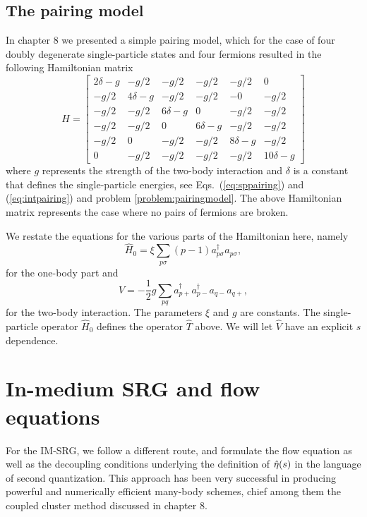 \subsection{The pairing model}
In chapter 8 we presented a simple pairing model, which for the case of four doubly degenerate single-particle states and 
four fermions resulted in the following Hamiltonian matrix
 \[
  H = \begin{bmatrix}
  2\delta -g & -g/2 & -g/2 & -g/2 & -g/2 & 0 \\ -g/2 & 4\delta -g &
  -g/2 & -g/2 & -0 & -g/2 \\ -g/2 & -g/2 & 6\delta -g & 0 & -g/2 &
  -g/2 \\ -g/2 & -g/2 & 0 & 6\delta-g & -g/2 & -g/2 \\ -g/2 & 0 & -g/2
  & -g/2 & 8\delta-g & -g/2 \\ 0 & -g/2 & -g/2 & -g/2 & -g/2 &
  10\delta -g
  \end{bmatrix}
  \]
where $g$ represents the strength of the two-body interaction and $\delta$ is a constant that defines the single-particle energies, see Eqs.~(\ref{eq:sppairing}) and 
(\ref{eq:intpairing}) and problem \ref{problem:pairingmodel}.  The above Hamiltonian matrix represents the case where no pairs of fermions are broken.

We restate the equations for the various parts of the Hamiltonian here, namely
 \[
  \hat{H}_0 = \xi \sum_{p \sigma} (p-1) a^{\dagger}_{p \sigma} a_{p\sigma},
  \]
for the one-body part
and 
  \[
  \hat{V} = -\frac{1}{2}g \sum_{pq} a^{\dagger}_{p+}a^{\dagger}_{p-}a_{q-}a_{q+},
  \]
for the two-body interaction. The parameters $\xi$ and $g$ are constants.
The single-particle operator $\hat{H}_0$ defines the operator $\hat{T}$ above. We will let $\hat{V}$ have an explicit $s$ dependence. 



\section{In-medium SRG and flow equations}
For the IM-SRG, we follow a different route, and formulate the flow equation as well as the decoupling conditions underlying the definition of $\hat{\eta}(s)$ in the language of second quantization. This approach has been very successful in producing powerful and numerically efficient many-body schemes, chief among them the coupled cluster method discussed in chapter 8.

